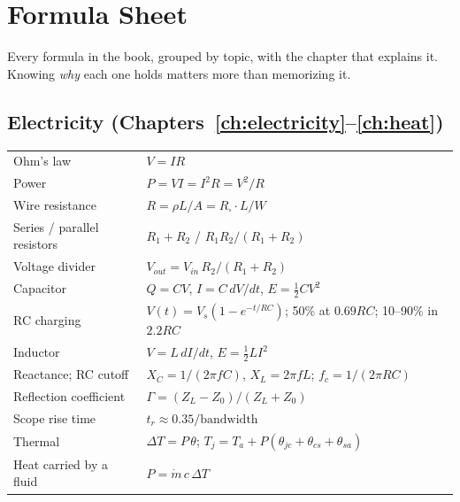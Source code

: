 \chapter{Formula Sheet}
\label{app:formulas}

Every formula in the book, grouped by topic, with the chapter that explains it. Knowing \emph{why} each one holds matters more than memorizing it.

\section*{Electricity (Chapters~\ref{ch:electricity}--\ref{ch:heat})}
\begin{center}
\begin{tabularx}{\linewidth}{>{\raggedright\arraybackslash}p{4.6cm}>{\raggedright\arraybackslash}X}
\toprule
Ohm's law & $V = IR$ \\
Power & $P = VI = I^2R = V^2/R$ \\
Wire resistance & $R = \rho L/A = R_\square \cdot L/W$ \\
Series / parallel resistors & $R_1 + R_2$ \quad / \quad $R_1R_2/(R_1+R_2)$ \\
Voltage divider & $V_{out} = V_{in}\,R_2/(R_1+R_2)$ \\
Capacitor & $Q = CV$, \; $I = C\,dV/dt$, \; $E = \tfrac12CV^2$ \\
RC charging & $V(t) = V_s(1 - e^{-t/RC})$; 50\% at $0.69RC$; 10--90\% in $2.2RC$ \\
Inductor & $V = L\,dI/dt$, \; $E = \tfrac12LI^2$ \\
Reactance; RC cutoff & $X_C = 1/(2\pi fC)$, $X_L = 2\pi fL$; \; $f_c = 1/(2\pi RC)$ \\
Reflection coefficient & $\Gamma = (Z_L - Z_0)/(Z_L + Z_0)$ \\
Scope rise time & $t_r \approx 0.35/\text{bandwidth}$ \\
Thermal & $\Delta T = P\,\theta$; \; $T_j = T_a + P(\theta_{jc} + \theta_{cs} + \theta_{sa})$ \\
Heat carried by a fluid & $P = \dot m\,c\,\Delta T$ \\
\bottomrule
\end{tabularx}
\end{center}

